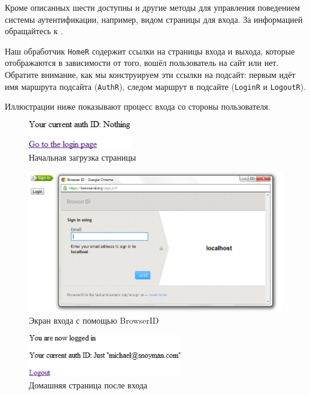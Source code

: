 Кроме описанных шести доступны и другие методы для управления поведением
системы аутентификации, например, видом страницы для входа. За информацией
обращайтесь к
.

Наш обработчик \lstinline'HomeR' содержит ссылки на страницы входа и выхода,
которые отображаются в зависимости от того, вошёл пользователь на сайт или нет.
Обратите внимание, как мы конструируем эти ссылки на подсайт: первым идёт имя
маршрута подсайта (\lstinline'AuthR'), следом маршрут в подсайте
(\lstinline'LoginR' и \lstinline'LogoutR').

Иллюстрации ниже показывают процесс входа со стороны пользователя.

\begin{figure}[h!]
  \centering
  \includegraphics[width=0.4\textwidth]{authentication-and-authorization/initial-screen.png}
  \caption{Начальная загрузка страницы}
\end{figure}

\begin{figure}[h!]
  \centering
  \includegraphics[width=1\textwidth]{authentication-and-authorization/login-with-browserid.png}
  \caption{Экран входа с помощью BrowserID}
\end{figure}

\begin{figure}[h!]
  \centering
  \includegraphics[width=0.6\textwidth]{authentication-and-authorization/after-login.png}
  \caption{Домашняя страница после входа}
\end{figure}

